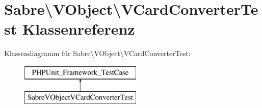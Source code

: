 \hypertarget{class_sabre_1_1_v_object_1_1_v_card_converter_test}{}\section{Sabre\textbackslash{}V\+Object\textbackslash{}V\+Card\+Converter\+Test Klassenreferenz}
\label{class_sabre_1_1_v_object_1_1_v_card_converter_test}
Klassendiagramm für Sabre\textbackslash{}V\+Object\textbackslash{}V\+Card\+Converter\+Test\+:\begin{figure}[H]
\begin{center}
\leavevmode
\includegraphics[height=2.000000cm]{class_sabre_1_1_v_object_1_1_v_card_converter_test}
\end{center}
\end{figure}
